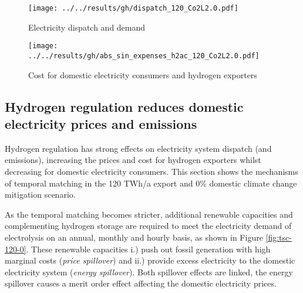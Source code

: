 \begin{figure*}[h!]
    \centering
    \begin{subfigure}[b]{0.49\linewidth}
        \centering
        \texttt{[image: ../../results/gh/dispatch\_120\_Co2L2.0.pdf]}
        \caption{Electricity dispatch and demand}
        \label{fig:dispatch_rule}
    \end{subfigure}
    \hfill
    \begin{subfigure}[b]{0.49\linewidth}
        \centering
        \texttt{[image: ../../results/gh/abs\_sin\_expenses\_h2ac\_120\_Co2L2.0.pdf]}
        \caption{Cost for domestic electricity consumers and hydrogen exporters}
        \label{fig:expense_h2ac}
    \end{subfigure}
    \hfill
    \caption{Electricity dispatch and demand (\ref{fig:dispatch_rule}) and cost for consumers (\ref{fig:expense_h2ac}) for various (hydrogen) temporal matching regimes in the 120 TWh/a export and 0\% climate change mitigation scenario. Stricter temporal matching decreases carbon-intensive electricity generation (coal \& gas) for hydrogen generation and even domestic electricity consumers (s. Fig. \ref{fig:dispatch_rule}). Cost for export hydrogen generation increase to fulfill the temporal matching constraint, whereas domestic electricity consumers profit from stricter hydrogen regulation.}
    \label{fig:expenses_rule}
\end{figure*}


\subsection*{Hydrogen regulation reduces domestic electricity prices and emissions}
\label{subsec:benefits_rule}

Hydrogen regulation has strong effects on electricity system dispatch (and emissions), increasing the prices and cost for hydrogen exporters whilst decreasing for domestic electricity consumers. This section shows the mechanisms of temporal matching in the 120 TWh/a export and 0\% domestic climate change mitigation scenario.

As the temporal matching becomes stricter, additional renewable capacities and complementing hydrogen storage are required to meet the electricity demand of electrolysis on an annual, monthly and hourly basis, as shown in Figure \ref{fig:tsc-120-0}. These renewable capacities i.) push out fossil generation with high marginal costs (\textit{price spillover}) and ii.) provide excess electricity to the domestic electricity system (\textit{energy spillover}). Both spillover effects are linked, the energy spillover causes a merit order effect affecting the domestic electricity prices.

